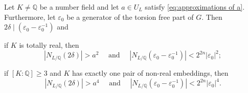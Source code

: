 \begin{lem}
  Let \(K ≠ ℚ\) be a number field and let \(a ∈ U_L\) satisfy
  \eqref{eq:approximations of a}. Furthermore, let \(ε_0\) be a generator of the
  torsion free part of \(G\). Then \(2δ \mid (ε_0 - ε_0^{-1})\) and
  \begin{thmlist}
    \item if \(K\) is totally real, then
    \[
      |N_{L/ℚ} (2 δ)| > a^2 \quad \text{ and } \quad
      |N_{L/ℚ} (ε_0 - ε_0^{-1})| < 2^{2n} |ε_0|^2;
    \]

    \item if \([K: ℚ] ≥ 3\) and \(K\) has exactly one pair of non-real embeddings, then
    \[
      |N_{L/ℚ} (2 δ)| > a^4 \quad \text{ and } \quad
      |N_{L/ℚ} (ε_0 - ε_0^{-1})| < 2^{2n} |ε_0|^4.
    \]
  \end{thmlist}
\end{lem}
